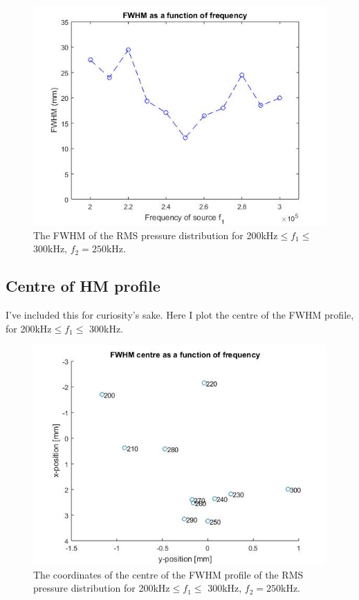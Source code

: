 \documentclass[10pt,a4paper]{article}
\begin{document}
\begin{figure}[H]\label{FWHM_freq}
\centering
\includegraphics[scale=0.6]{FWHM_freq}
\caption{The FWHM of the RMS pressure distribution for 200kHz$\leq f_1 \leq$ 300kHz, $f_2 = 250$kHz.}
\end{figure}


\subsection{Centre of HM profile}

I've included this for curiosity's sake. Here I plot the centre of the FWHM profile, for 200kHz$\leq f_1 \leq$ 300kHz.
\begin{figure}[H]\label{FWHM_centre}
\centering
\includegraphics[scale=0.6]{FWHM_centre}
\caption{The coordinates of the centre of the FWHM profile of the RMS pressure distribution for 200kHz$\leq f_1 \leq$ 300kHz, $f_2 = 250$kHz.}
\end{figure}
\end{document}
